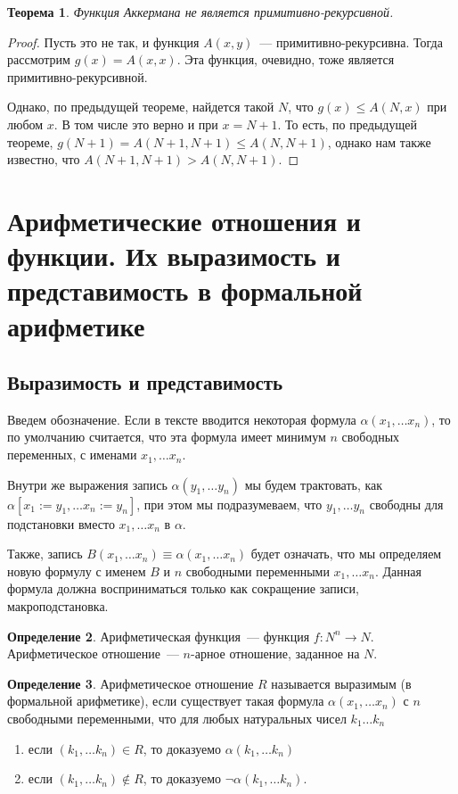 \documentclass[a4paper,11pt]{article}
\newtheorem{thm}{Теорема}[section]
\theoremstyle{definition}
\newtheorem{dfn}[thm]{Определение}
\begin{document}
\begin{thm}
Функция Аккермана не является примитивно-рекурсивной.
\end{thm}
\begin{proof}
Пусть это не так, и функция $A(x, y)$~--- примитивно-рекурсивна. Тогда
рассмотрим $g(x) = A(x, x)$. Эта функция, очевидно, тоже является
примитивно-рекурсивной.

Однако, по предыдущей теореме, найдется такой $N$, что $g(x) \le A(N, x)$ при
любом $x$. В том числе это верно и при $x = N+1$. То есть, по предыдущей
теореме, $g(N+1) = A(N+1, N+1) \le A(N, N+1)$, однако нам также известно, что
$A(N+1, N+1) > A(N, N+1)$.
\end{proof}

\section{Арифметические отношения и функции. Их выразимость и представимость в формальной арифметике}
\subsection{Выразимость и представимость}
Введем обозначение. Если в тексте вводится некоторая формула $\alpha(x_1, \dots
x_n)$, то по умолчанию считается, что эта формула имеет минимум $n$ свободных
переменных, с именами $x_1, \dots x_n$.

Внутри же выражения запись $\alpha(y_1, \dots y_n)$ мы будем трактовать, как
$\alpha[x_1 := y_1, \dots x_n := y_n]$, при этом мы подразумеваем, что $y_1,
\dots y_n$ свободны для подстановки вместо $x_1, \dots x_n$ в $\alpha$.

Также, запись $B(x_1, \dots x_n) \equiv \alpha(x_1, \dots x_n)$ будет означать,
что мы определяем новую формулу с именем $B$ и $n$ свободными переменными $x_1,
\dots x_n$. Данная формула должна восприниматься только как сокращение записи,
макроподстановка.

\begin{dfn}
Арифметическая функция~--- функция $f : N^n \to N$. Арифметическое отношение~---
$n$-арное отношение, заданное на $N$.
\end{dfn}

\begin{dfn}
Арифметическое отношение $R$ называется выразимым (в формальной арифметике),
если существует такая формула $\alpha(x_1, \dots x_n)$ с $n$ свободными
переменными, что для любых натуральных чисел $k_1 \dots k_n$
\begin{enumerate}
\item если $(k_1, \dots k_n) \in R$, то доказуемо $\alpha(k_1, \dots k_n)$
\item если $(k_1, \dots k_n) \notin R$, то доказуемо $\neg\alpha(k_1, \dots
  k_n)$.
\end{enumerate}
\end{dfn}
\end{document}
